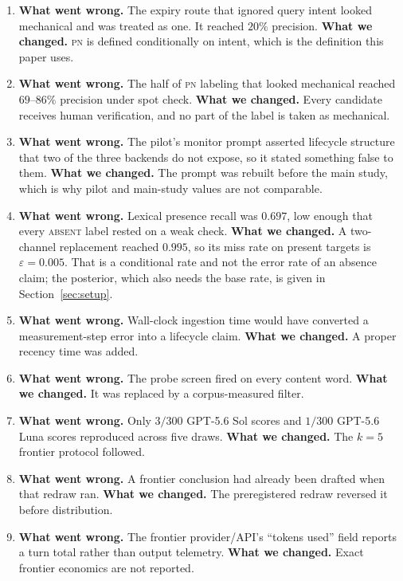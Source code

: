 \documentclass{article}
\newcommand{\absent}{\textsc{absent}}
\newcommand{\pn}{\textsc{pn}}
\begin{document}
\begin{enumerate}
\item %
\textbf{What went wrong.} The expiry route that ignored query intent looked mechanical and was treated as one. It reached $20\%$ precision. \textbf{What we changed.} \pn{} is defined conditionally on intent, which is the definition this paper uses.
\item %
\textbf{What went wrong.} The half of \pn{} labeling that looked mechanical reached $69$--$86\%$ precision under spot check. \textbf{What we changed.} Every candidate receives human verification, and no part of the label is taken as mechanical.
\item %
\textbf{What went wrong.} The pilot's monitor prompt asserted lifecycle structure that two of the three backends do not expose, so it stated something false to them. \textbf{What we changed.} The prompt was rebuilt before the main study, which is why pilot and main-study values are not comparable.
\item %
\textbf{What went wrong.} Lexical presence recall was $0.697$, low enough that every \absent{} label rested on a weak check. \textbf{What we changed.} A two-channel replacement reached $0.995$, so its miss rate on present targets is $\varepsilon=0.005$. That is a conditional rate and not the error rate of an absence claim; the posterior, which also needs the base rate, is given in Section~\ref{sec:setup}.
\item %
\textbf{What went wrong.} Wall-clock ingestion time would have converted a measurement-step error into a lifecycle claim. \textbf{What we changed.} A proper recency time was added.
\item %
\textbf{What went wrong.} The probe screen fired on every content word. \textbf{What we changed.} It was replaced by a corpus-measured filter.
\item %
\textbf{What went wrong.} Only $3/300$ GPT-5.6 Sol scores and $1/300$ GPT-5.6 Luna scores reproduced across five draws. \textbf{What we changed.} The $k=5$ frontier protocol followed.
\item %
\textbf{What went wrong.} A frontier conclusion had already been drafted when that redraw ran. \textbf{What we changed.} The preregistered redraw reversed it before distribution.
\item %
\textbf{What went wrong.} The frontier provider/API's ``tokens used'' field reports a turn total rather than output telemetry. \textbf{What we changed.} Exact frontier economics are not reported.

\end{enumerate}
\end{document}
